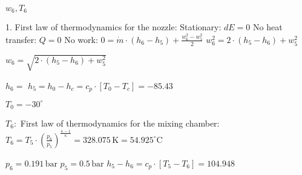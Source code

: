 \( w_6, T_6 \)

1. First law of thermodynamics for the nozzle:  
Stationary: \( dE = 0 \)  
No heat transfer: \( Q = 0 \)  
No work:  
\( 0 = \dot{m} \cdot (h_6 - h_5) + \frac{w_6^2 - w_5^2}{2} \)  
\( w_6^2 = 2 \cdot (h_5 - h_6) + w_5^2 \)

\( w_6 = \sqrt{2 \cdot (h_5 - h_6) + w_5^2} \)

\( h_6 = \)  
\( h_5 = h_0 - h_c = c_p \cdot [T_0 - T_c] = -85.43 \)

\( T_0 = -30^\circ \)

\( T_6: \)  
First law of thermodynamics for the mixing chamber:  
\( T_6 = T_5 \cdot \left( \frac{p_6}{p_5} \right)^{\frac{\kappa - 1}{\kappa}} = 328.075 \, \text{K} = 54.925^\circ \text{C} \)

\( p_6 = 0.191 \, \text{bar} \)  
\( p_5 = 0.5 \, \text{bar} \)  
\( h_5 - h_6 = c_p \cdot [T_5 - T_6] = 104.948 \)